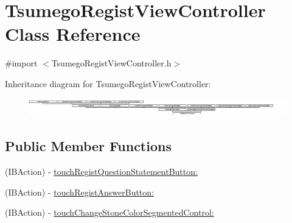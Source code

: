 \hypertarget{interface_tsumego_regist_view_controller}{
\section{TsumegoRegistViewController Class Reference}
\label{interface_tsumego_regist_view_controller}
}


{\ttfamily \#import $<$TsumegoRegistViewController.h$>$}

Inheritance diagram for TsumegoRegistViewController:\begin{figure}[H]
\begin{center}
\leavevmode
\includegraphics[height=0.790123cm]{interface_tsumego_regist_view_controller}
\end{center}
\end{figure}
\subsection*{Public Member Functions}
\begin{DoxyCompactItemize}
\item 
(IBAction) -\/ \hyperlink{interface_tsumego_regist_view_controller_a0fb30c57c5fc322ce12324e540e34b05}{touchRegistQuestionStatementButton:}
\item 
(IBAction) -\/ \hyperlink{interface_tsumego_regist_view_controller_a7ce4b83cc166f8846ab8412a4072c0b8}{touchRegistAnswerButton:}
\item 
(IBAction) -\/ \hyperlink{interface_tsumego_regist_view_controller_a1f40816e28988f32491959408490fa68}{touchChangeStoneColorSegmentedControl:}
\end{DoxyCompactItemize}
